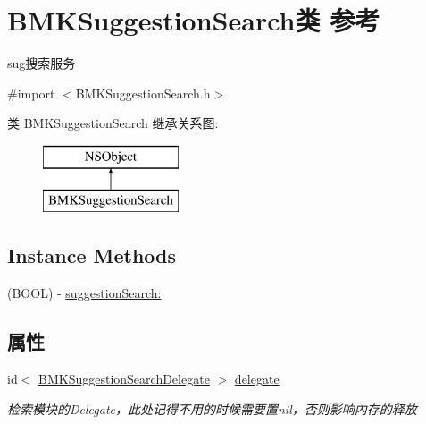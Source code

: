 \hypertarget{interface_b_m_k_suggestion_search}{\section{B\+M\+K\+Suggestion\+Search类 参考}
\label{interface_b_m_k_suggestion_search}
}


sug搜索服务  




{\ttfamily \#import $<$B\+M\+K\+Suggestion\+Search.\+h$>$}

类 B\+M\+K\+Suggestion\+Search 继承关系图\+:\begin{figure}[H]
\begin{center}
\leavevmode
\includegraphics[height=2.000000cm]{interface_b_m_k_suggestion_search}
\end{center}
\end{figure}
\subsection*{Instance Methods}
\begin{DoxyCompactItemize}
\item 
(B\+O\+O\+L) -\/ \hyperlink{interface_b_m_k_suggestion_search_a86144cad8ce80290cb6c352f5b68cbdc}{suggestion\+Search\+:}
\end{DoxyCompactItemize}
\subsection*{属性}
\begin{DoxyCompactItemize}
\item 
\hypertarget{interface_b_m_k_suggestion_search_a37cc038d39539458fe7071154b2ddaaa}{id$<$ \hyperlink{protocol_b_m_k_suggestion_search_delegate-p}{B\+M\+K\+Suggestion\+Search\+Delegate} $>$ \hyperlink{interface_b_m_k_suggestion_search_a37cc038d39539458fe7071154b2ddaaa}{delegate}}\label{interface_b_m_k_suggestion_search_a37cc038d39539458fe7071154b2ddaaa}

\begin{DoxyCompactList}\small\item\em 检索模块的\+Delegate，此处记得不用的时候需要置nil，否则影响内存的释放 \end{DoxyCompactList}\end{DoxyCompactItemize}


